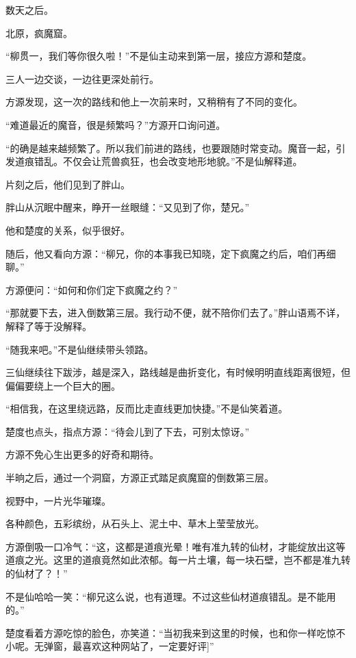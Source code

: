 
\begin{this_body}



数天之后。

北原，疯魔窟。

“柳贯一，我们等你很久啦！”不是仙主动来到第一层，接应方源和楚度。

三人一边交谈，一边往更深处前行。

方源发现，这一次的路线和他上一次前来时，又稍稍有了不同的变化。

“难道最近的魔音，很是频繁吗？”方源开口询问道。

“的确是越来越频繁了。所以我们前进的路线，也要跟随时常变动。魔音一起，引发道痕错乱。不仅会让荒兽疯狂，也会改变地形地貌。”不是仙解释道。

片刻之后，他们见到了胖山。

胖山从沉眠中醒来，睁开一丝眼缝：“又见到了你，楚兄。”

他和楚度的关系，似乎很好。

随后，他又看向方源：“柳兄，你的本事我已知晓，定下疯魔之约后，咱们再细聊。”

方源便问：“如何和你们定下疯魔之约？”

“那就要下去，进入倒数第三层。我行动不便，就不陪你们去了。”胖山语焉不详，解释了等于没解释。

“随我来吧。”不是仙继续带头领路。

三仙继续往下跋涉，越是深入，路线越是曲折变化，有时候明明直线距离很短，但偏偏要绕上一个巨大的圈。

“相信我，在这里绕远路，反而比走直线更加快捷。”不是仙笑着道。

楚度也点头，指点方源：“待会儿到了下去，可别太惊讶。”

方源不免心生出更多的好奇和期待。

半晌之后，通过一个洞窟，方源正式踏足疯魔窟的倒数第三层。

视野中，一片光华璀璨。

各种颜色，五彩缤纷，从石头上、泥土中、草木上莹莹放光。

方源倒吸一口冷气：“这，这都是道痕光晕！唯有准九转的仙材，才能绽放出这等道痕之光。这里的道痕竟然如此浓郁。每一片土壤，每一块石壁，岂不都是准九转的仙材了？！”

不是仙哈哈一笑：“柳兄这么说，也有道理。不过这些仙材道痕错乱。是不能用的。”

楚度看着方源吃惊的脸色，亦笑道：“当初我来到这里的时候，也和你一样吃惊不小呢。无弹窗，最喜欢这种网站了，一定要好评]”


\end{this_body}

